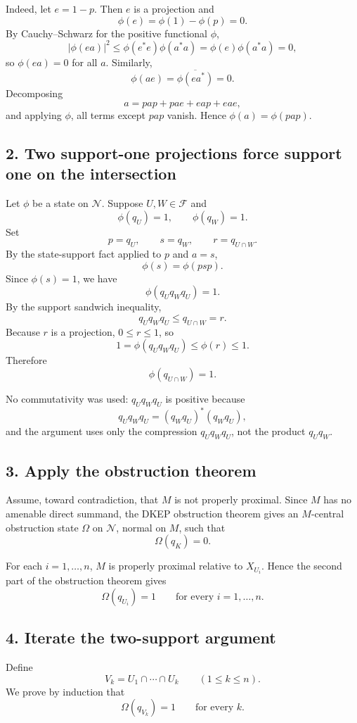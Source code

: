 \documentclass[12pt]{article}
\begin{document}
Indeed, let \(e=1-p\). Then \(e\) is a projection and
\[
\phi(e)=\phi(1)-\phi(p)=0.
\]
By Cauchy–Schwarz for the positive functional \(\phi\),
\[
|\phi(ea)|^2\le \phi(e^*e)\phi(a^*a)=\phi(e)\phi(a^*a)=0,
\]
so \(\phi(ea)=0\) for all \(a\). Similarly,
\[
\phi(ae)=\overline{\phi(ea^*)}=0.
\]
Decomposing
\[
a=pap+pae+eap+eae,
\]
and applying \(\phi\), all terms except \(pap\) vanish. Hence \(\phi(a)=\phi(pap)\).

\subsection*{2. Two support-one projections force support one on the intersection}

Let \(\phi\) be a state on \(\mathcal N\). Suppose \(U,W\in\mathcal F\) and
\[
\phi(q_U)=1,\qquad \phi(q_W)=1.
\]
Set
\[
p=q_U,\qquad s=q_W,\qquad r=q_{U\cap W}.
\]
By the state-support fact applied to \(p\) and \(a=s\),
\[
\phi(s)=\phi(psp).
\]
Since \(\phi(s)=1\), we have
\[
\phi(q_Uq_Wq_U)=1.
\]
By the support sandwich inequality,
\[
q_Uq_Wq_U\le q_{U\cap W}=r.
\]
Because \(r\) is a projection, \(0\le r\le 1\), so
\[
1=\phi(q_Uq_Wq_U)\le \phi(r)\le 1.
\]
Therefore
\[
\phi(q_{U\cap W})=1.
\]

No commutativity was used: \(q_Uq_Wq_U\) is positive because
\[
q_Uq_Wq_U=(q_Wq_U)^*(q_Wq_U),
\]
and the argument uses only the compression \(q_Uq_Wq_U\), not the product \(q_Uq_W\).

\subsection*{3. Apply the obstruction theorem}

Assume, toward contradiction, that \(M\) is not properly proximal. Since \(M\) has no amenable direct summand, the DKEP obstruction theorem gives an \(M\)-central obstruction state \(\Omega\) on \(\mathcal N\), normal on \(M\), such that
\[
\Omega(q_K)=0.
\]

For each \(i=1,\dots,n\), \(M\) is properly proximal relative to \(X_{U_i}\). Hence the second part of the obstruction theorem gives
\[
\Omega(q_{U_i})=1
\qquad\text{for every }i=1,\dots,n.
\]

\subsection*{4. Iterate the two-support argument}

Define
\[
V_k=U_1\cap\cdots\cap U_k
\qquad (1\le k\le n).
\]
We prove by induction that
\[
\Omega(q_{V_k})=1
\qquad\text{for every }k.
\]
\end{document}
